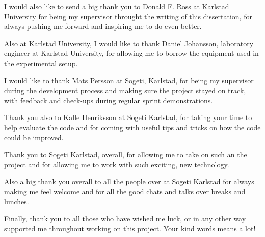 \documentclass[12pt,twoside]{kau_report}
\begin{document}
\begin{frontmatter}
\begin{acknowledgements}
I would also like to send a big thank you to Donald F. Ross at Karlstad University for being my supervisor throught the writing of this dissertation, for always pushing me forward and inspiring me to do even better.

Also at Karlstad University, I would like to thank Daniel Johansson, laboratory engineer at Karlstad University, for allowing me to borrow the equipment used in the experimental setup.

I would like to thank Mats Persson at Sogeti, Karlstad, for being my supervisor during the development process and making sure the project stayed on track, with feedback and check-ups during regular sprint demonstrations. 

Thank you also to Kalle Henriksson at Sogeti Karlstad, for taking your time to help evaluate the code and for coming with useful tips and tricks on how the code could be improved.

Thank you to Sogeti Karlstad, overall, for allowing me to take on such an the project and for allowing me to work with such exciting, new technology. 

Also a big thank you overall to all the people over at Sogeti Karlstad for always making me feel welcome and for all the good chats and talks over breaks and lunches.

Finally, thank you to all those who have wished me luck, or in any other way supported me throughout working on this project. Your kind words means a lot!








\end{acknowledgements}
\cleardoublepage

  \tableofcontents
  \cleardoublepage

  \listoffigures
  \cleardoublepage

  \listoftables
  \cleardoublepage
  
  \lstlistoflistings
  \cleardoublepage

\end{frontmatter}
\end{document}
